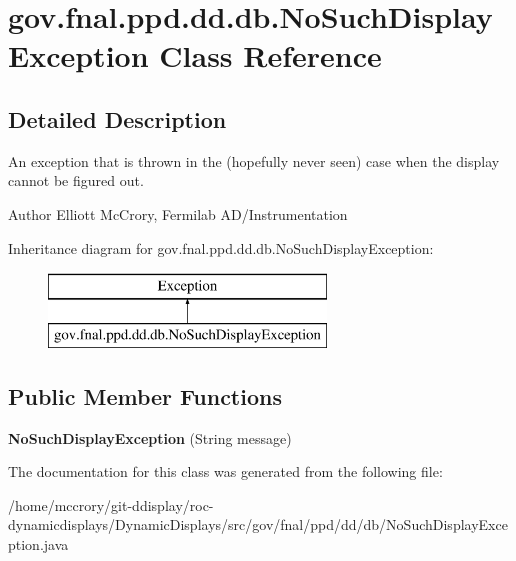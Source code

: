 \hypertarget{classgov_1_1fnal_1_1ppd_1_1dd_1_1db_1_1NoSuchDisplayException}{\section{gov.\-fnal.\-ppd.\-dd.\-db.\-No\-Such\-Display\-Exception Class Reference}
\label{classgov_1_1fnal_1_1ppd_1_1dd_1_1db_1_1NoSuchDisplayException}
}


\subsection{Detailed Description}
An exception that is thrown in the (hopefully never seen) case when the display cannot be figured out.

\begin{DoxyAuthor}{Author}
Elliott Mc\-Crory, Fermilab A\-D/\-Instrumentation 
\end{DoxyAuthor}
Inheritance diagram for gov.\-fnal.\-ppd.\-dd.\-db.\-No\-Such\-Display\-Exception\-:\begin{figure}[H]
\begin{center}
\leavevmode
\includegraphics[height=2.000000cm]{classgov_1_1fnal_1_1ppd_1_1dd_1_1db_1_1NoSuchDisplayException}
\end{center}
\end{figure}
\subsection*{Public Member Functions}
\begin{DoxyCompactItemize}
\item 
\hypertarget{classgov_1_1fnal_1_1ppd_1_1dd_1_1db_1_1NoSuchDisplayException_a146774399d8da17cc34caed0f073d072}{{\bfseries No\-Such\-Display\-Exception} (String message)}\label{classgov_1_1fnal_1_1ppd_1_1dd_1_1db_1_1NoSuchDisplayException_a146774399d8da17cc34caed0f073d072}

\end{DoxyCompactItemize}


The documentation for this class was generated from the following file\-:\begin{DoxyCompactItemize}
\item 
/home/mccrory/git-\/ddisplay/roc-\/dynamicdisplays/\-Dynamic\-Displays/src/gov/fnal/ppd/dd/db/No\-Such\-Display\-Exception.\-java\end{DoxyCompactItemize}

